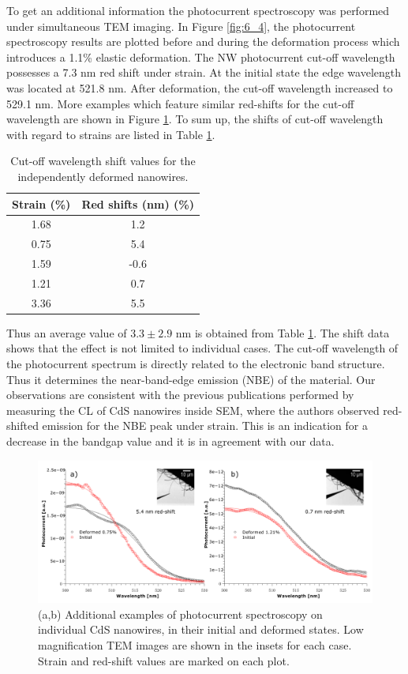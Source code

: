 To get an additional information the photocurrent spectroscopy was performed under simultaneous TEM imaging. 
In Figure \ref{fig:6_4}, the photocurrent spectroscopy results are plotted before and during the deformation process which introduces a 1.1\% elastic deformation.
The NW photocurrent cut-off wavelength possesses a 7.3 nm red shift under strain. At the initial state the edge wavelength was located at 521.8 nm. After deformation, the cut-off wavelength increased to 529.1 nm. 
More examples which feature similar red-shifts for the cut-off wavelength are shown in Figure \ref{fig:6_s3}. 
To sum up, the shifts of cut-off wavelength with regard to strains are listed in Table \ref{tab:6_1}. 

\begin{table}
    \centering
    \begin{tabular}{c|c}
    \hline
         Strain (\%) & Red shifts (nm) (\%)\\
         \hline
         1.68 & 1.2\\
         0.75 & 5.4\\
         1.59 & -0.6\\
         1.21 & 0.7\\
         3.36 & 5.5\\
         \hline
    \end{tabular}
    \caption{Cut-off wavelength shift values for the independently deformed nanowires.}
    \label{tab:6_1}
\end{table}

Thus an average value of $3.3\pm2.9$ nm is obtained from Table \ref{tab:6_1}. The shift data shows that the effect is not limited to individual cases. 
The cut-off wavelength of the photocurrent spectrum is directly related to the electronic band structure. Thus it determines the near-band-edge emission (NBE) of the material. 
Our observations are consistent with the previous publications performed by measuring the CL of CdS nanowires inside SEM, where the authors observed red-shifted emission for the NBE peak under strain. 
This is an indication for a decrease in the bandgap value and it is in agreement with our data.\cite{Fu2011}

\begin{figure}  
\includegraphics[width=\textwidth]{figures/figure6_s3}
\caption[Photocurrent spectroscopy of deformed CdS NW]
{(a,b) Additional examples of photocurrent spectroscopy on individual CdS nanowires, in their initial and deformed states. Low magnification TEM images are shown in the insets for each case. Strain and red-shift values are marked on each plot. 
\label{fig:6_s3}}
\end{figure}



